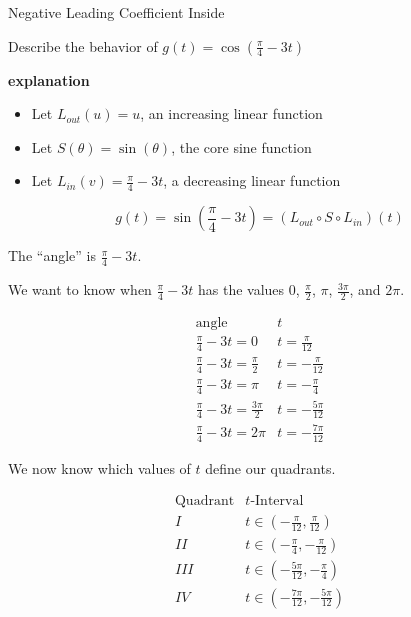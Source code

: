 \documentclass{ximera}
\begin{document}
\begin{example} Negative Leading Coefficient Inside

Describe the behavior of   $g(t) = \cos\left( \frac{\pi}{4} - 3 t \right)$



\textbf{\textcolor{red!75!green}{explanation}} 




\begin{itemize}
\item Let $L_{out}(u) = u$, an increasing linear function
\item Let $S(\theta) = \sin(\theta)$, the core sine function
\item Let $L_{in}(v) = \frac{\pi}{4} - 3 t$, a decreasing linear function
\end{itemize}


\[
g(t) = \sin\left( \frac{\pi}{4} - 3 t \right) = (L_{out} \circ S \circ L_{in})(t)
\]




The ``angle'' is $\frac{\pi}{4} - 3 t$.

We want to know when $\frac{\pi}{4} - 3 t$ has the values $0$, $\frac{\pi}{2}$, $\pi$, $\frac{3\pi}{2}$, and $2\pi$.






\[
\begin{array}{l|l}
\text{angle}                  & t  \\ \hline
\frac{\pi}{4} - 3 t = 0        & t = \frac{\pi}{12}  \\
\frac{\pi}{4} - 3 t = \frac{\pi}{2}      &  t = -\frac{\pi}{12} \\
\frac{\pi}{4} - 3 t = \pi      & t = -\frac{\pi}{4}  \\
\frac{\pi}{4} - 3 t = \frac{3\pi}{2}     & t = -\frac{5\pi}{12}   \\
\frac{\pi}{4} - 3 t = 2\pi     & t = -\frac{7\pi}{12}
\end{array}
\]


We now know which values of $t$ define our quadrants.




\[
\begin{array}{l|l}
\text{Quadrant}                  & t\text{-Interval}  \\ \hline
I        & t \in  \left( -\frac{\pi}{12}, \frac{\pi}{12} \right)  \\
II       & t \in  \left( -\frac{\pi}{4}, -\frac{\pi}{12} \right) \\
III      & t \in  \left( -\frac{5\pi}{12}, -\frac{\pi}{4} \right)  \\
IV       & t \in  \left( -\frac{7\pi}{12}, -\frac{5\pi}{12} \right)   \\
\end{array}
\]


\end{example}
\end{document}
